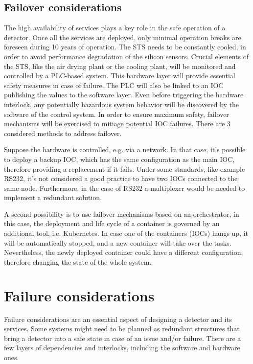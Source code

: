 \subsection{Failover considerations}
The high availability of services plays a key role in the safe operation of a detector. Once all the services are deployed, only minimal operation breaks are foreseen during 10 years of operation. The STS needs to be constantly cooled, in order to avoid performance degradation of the silicon sensors.
Crucial elements of the STS, like the air drying plant or the cooling plant, will be monitored and controlled by a PLC-based system. This hardware layer will provide essential safety measures in case of failure. The PLC will also be linked to an \gls{IOC} publishing the values to the software layer. Even before triggering the hardware interlock, any potentially hazardous system behavior will be discovered by the software of the control system. In order to ensure maximum safety, failover mechanisms will be exercised to mitiage potential \gls{IOC} failures. There are 3 considered methods to address failover. 

Suppose the hardware is controlled, e.g. via a network. In that case, it's possible to deploy a backup \gls{IOC}, which has the same configuration as the main \gls{IOC}, therefore providing a replacement if it fails. Under some standards, like example RS232, it's not considered a good practice to have two \glspl{IOC} connected to the same node. Furthermore, in the case of RS232 a multiplexer would be needed to implement a redundant solution. 

A second possibility is to use failover mechanisms based on an orchestrator, in this case, the deployment and life cycle of a container is governed by an additional tool, i.e. Kubernetes. In case one of the containers (\glspl{IOC}) hangs up, it will be automatically stopped, and a new container will take over the tasks. Nevertheless, the newly deployed container could have a different configuration, therefore changing the state of the whole system. 

\section{Failure considerations}

Failure considerations are an essential aspect of designing a detector and its services. Some systems might need to be planned as redundant structures that bring a detector into a safe state in case of an issue and/or failure. There are a few layers of dependencies and interlocks, including the software and hardware ones.

